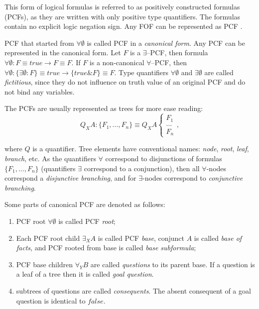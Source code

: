 \documentclass[runningheads,a4paper]{llncs}
\begin{document}
This form of logical formulas is referred to as positively constructed formulas (PCFs), as they are written with only positive type quantifiers. The formulas contain no explicit logic negation sign. Any FOF can be represented as PCF \cite{ICDS2000}.

PCF that started from $\forall \emptyset$ is called PCF in a {\em canonical form}. Any PCF can be represented in the canonical form. Let $F$ is a $\exists$--PCF, then formula
$\forall \emptyset\colon F \equiv true \rightarrow F \equiv F$. If $F$ is a non-canonical $\forall$--PCF, then $\forall \emptyset\colon\{\exists \emptyset\colon F\} \equiv true \rightarrow \{true\&F\} \equiv F$. Type quantifiers $\forall \emptyset$ and $\exists \emptyset$ are called {\em fictitious}, since they do not influence on truth value of an original PCF and do not bind any variables.  %

The PCFs are usually represented as trees for more ease reading:
$$Q_XA\colon\{F_1,\ldots,F_n\} \equiv Q_XA \left\{
\begin{array}{lcl}
 F_1 \\
 \ldots \\
 F_n
\end{array}
\right.,$$

\noindent where $Q$ is a quantifier. Tree elements have conventional names: \emph{node}, \emph{root}, \emph{leaf}, \emph{branch}, etc. As the quantifiers $\forall$ correspond to disjunctions of formulas $\{F_1,\ldots,F_n\}$ (quantifiers $\exists$ correspond to a conjunction), then all $\forall$-nodes correspond a {\em disjunctive branching}, and for $\exists$-nodes correspond to {\em conjunctive branching}.

Some parts of canonical PCF are denoted as follows:
\begin{enumerate}
\item PCF root $\forall \emptyset$ is called PCF {\em root};
\item Each PCF root child $\exists_XA$ is called PCF {\em base}, conjunct $A$ is called {\em base of facts}, and PCF rooted from base is called {\em base subformula};
\item PCF base children $\forall_YB$ are called {\em questions} to its parent base.  If a question is a leaf of a tree then it is called {\em goal question}.
\item subtrees of questions are called {\em consequents}.  The absent consequent of a goal question is identical to $false$.
\end{enumerate}
\end{document}
